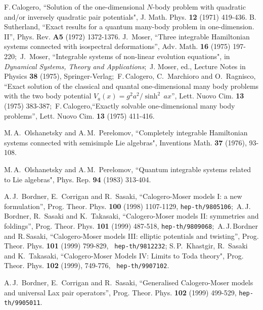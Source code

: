 \documentclass[a4paper,12pt]{article}
\begin{document}
\begin{thebibliography}{99}
  F.\,Calogero, ``Solution of the one-dimensional
\(N\)-body problem with quadratic and/or inversely quadratic pair
potentials", J. Math. Phys. {\bf 12} (1971) 419-436.
B.\, Sutherland, ``Exact results for a quantum many-body problem in
one-dimension. II'', Phys. Rev. {\bf A5} (1972) 1372-1376.
J.\, Moser, ``Three integrable Hamiltonian systems connected with
isospectral deformations'',  Adv. Math. {\bf 16} (1975) 197-220;\
J.\, Moser,  ``Integrable systems of non-linear evolution equations",
in {\it Dynamical Systems, Theory and Applications\/};\
J. Moser, ed., Lecture Notes in Physics {\bf 38} (1975),
Springer-Verlag;\
F.\,Calogero, C.\, Marchioro and O.\, Ragnisco, ``Exact solution of the
classical and quantal one-dimensional many body problems with
the two body potential \(V_{a}(x)=g^2a^2/\sinh^2\,ax\)'', Lett. Nuovo
Cim. {\bf 13} (1975) 383-387;\
F.\,Calogero,``Exactly solvable one-dimensional many body problems'',
Lett. Nuovo Cim. {\bf 13} (1975) 411-416.

\bibitem{OP1} M.\,A.\, Olshanetsky and A.\,M.\, Perelomov,
``Completely integrable Hamiltonian systems connected with
 semisimple Lie algebras",
 Inventions Math. {\bf 37} (1976), 93-108.

\bibitem{OP2}
M.\,A.\, Olshanetsky and A.\,M.\, Perelomov, ``Quantum integrable
systems
related to Lie algebras",
Phys. Rep. {\bf 94} (1983) 313-404.



 A.\,J.\, Bordner, E.\, Corrigan and R.\, Sasaki,
``Calogero-Moser models I: a new formulation'',
Prog. Theor. Phys. {\bf 100} (1998) 1107-1129, {\tt hep-th/9805106};\
A.\,J.\, Bordner,   R.\,
Sasaki and K.\, Takasaki, ``Calogero-Moser models II:
symmetries and foldings'', Prog. Theor. Phys. {\bf
101} (1999) 487-518, {\tt hep-th/9809068};\ A.\,J.\,Bordner and
R.\,Sasaki, ``Calogero-Moser models III: elliptic potentials and
twisting'', Prog. Theor. Phys. {\bf 101} (1999) 799-829, {\tt
hep-th/9812232};
S.\,P.\, Khastgir, R.\, Sasaki and K.\, Takasaki,
``Calogero-Moser Models IV: Limits to Toda theory",
 Prog. Theor. Phys. {\bf 102}  (1999), 749-776, {\tt
hep-th/9907102}.

\bibitem{bcs2}  A.\,J.\, Bordner, E.\, Corrigan and R.\, Sasaki,
``Generalised Calogero-Moser models and  universal Lax pair operators'',
 Prog. Theor. Phys. {\bf 102}  (1999)  499-529,
 {\tt  hep-th/9905011}.




\end{thebibliography}
\end{document}
